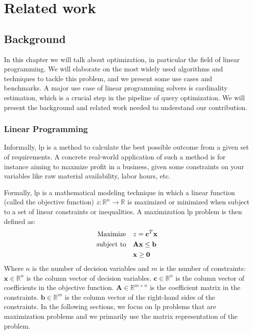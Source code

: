 
\chapter{Related work}\label{chapter:relatedwork}

\section{Background}
In this chapter we will talk about optimization, in particular the field
of linear programming. We will elaborate on
the most widely used algorithms and techniques to tackle this problem,
and we present some use cases and benchmarks.
A major use case of linear programming solvers is cardinality estimation, which
is a crucial step in the pipeline of query optimization. We will present
the background and related work needed to understand our contribution.

\subsection{Linear Programming}
Informally, \gls{lp} is a method to calculate the best possible outcome from a given set
of requirements. A concrete real-world application of such a method is
for instance aiming to maxmize profit in a business, given some constraints on your variables
like raw material availability, labor hours, etc.

Formally, \gls{lp} is a mathematical modeling technique in which
a linear function (called the objective function) \( z: \mathbb{R}^n \to \mathbb{R} \)
is maximized or minimized when subject to a set of linear constraints or inequalities.
A maximization \gls{lp} problem is then defined as:
\begin{align}
    \text{Maximize} \quad   & z = \mathbf{c}^T \mathbf{x} \notag            \\
    \text{subject to} \quad & \mathbf{A} \mathbf{x} \leq \mathbf{b} \notag  \\
                            & \mathbf{x} \geq \mathbf{0} \label{LP_Problem}
\end{align}
Where $n$ is the number of decision variables and $m$ is the number of constraints:
\(\mathbf{x} \in \mathbb{R}^n\) is the column vector of decision variables.
\(\mathbf{c} \in \mathbb{R}^n\) is the column vector of coefficients in the objective function.
\(\mathbf{A} \in \mathbb{R}^{m \times n}\) is the coefficient matrix in the constraints.
\(\mathbf{b} \in \mathbb{R}^m\) is the column vector of the right-hand sides of the constraints.
In the following sections, we focus on \gls{lp} problems that are maximization problems and we primarily
use the matrix representation of the problem.

